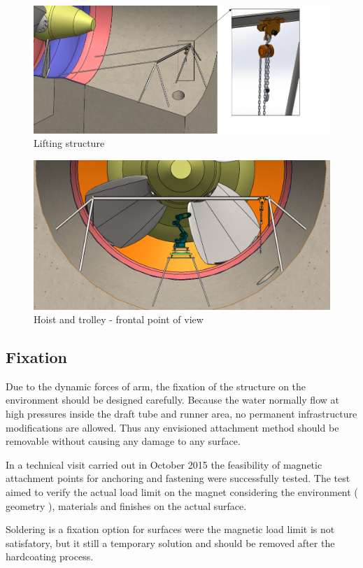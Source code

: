 \begin{figure}[h!]
   \centering
   \includegraphics[width=0.8\columnwidth]{figs/bases/talha}
   \caption{Lifting structure}
   \label{fig::talha}
\end{figure}

\begin{figure}[h!]
   \centering
   \includegraphics[width=0.8\columnwidth]{figs/bases/talha_trilho}
   \caption{Hoist and trolley - frontal point of view}
   \label{fig::talha_trilho}
\end{figure}

\subsection{Fixation}

Due to the dynamic forces of arm, the fixation of the structure on the
environment should be designed carefully. Because the water normally flow at
high pressures inside the draft tube and runner area, no permanent
infrastructure modifications are allowed. Thus any envisioned attachment method
should be removable without causing any damage to any surface.

In a technical visit carried out in October 2015 the
feasibility of magnetic attachment points for anchoring and fastening
were successfully tested.
The test aimed to verify the actual load limit on the magnet considering
the environment ( geometry ), materials and finishes on the actual surface.

Soldering is a fixation option for surfaces were the magnetic load limit is
not satisfatory, but it still a temporary solution and should be removed after
the hardcoating process.

